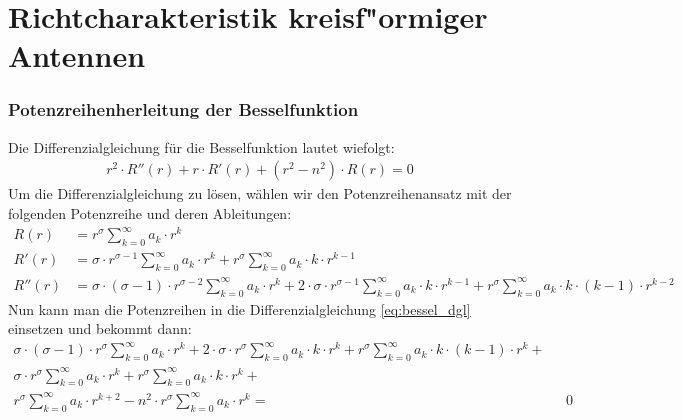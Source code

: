\chapter{Richtcharakteristik kreisf"ormiger Antennen\label{chapter:kreis}}
\begin{refsection}

\subsection{Potenzreihenherleitung der Besselfunktion}
Die Differenzialgleichung für die Besselfunktion lautet wiefolgt:
\begin{align}
	r^2 \cdot R''\left( r \right)
	+
	r \cdot R' \left( r \right)
	+
	\left( r^2 - n^2 \right) \cdot R \left( r \right)
	=
	0
	\label{eq:bessel_dgl}
\end{align}
Um die Differenzialgleichung zu l\"osen, w\"ahlen wir den Potenzreihenansatz mit der folgenden Potenzreihe und deren Ableitungen:
\begin{align*}
	R \left( r \right)
	&=
	r^{\sigma}
	\sum_{k=0}^{\infty} a_k \cdot r^k
\\
	R'\left( r \right)
	&=
	\sigma \cdot r^{\sigma - 1}
	\sum_{k=0}^{\infty} a_k \cdot r^k
	+
	r^{\sigma}
	\sum_{k=0}^{\infty} a_k \cdot k \cdot r^{k - 1}
\\
	R'' \left( r \right)
	&=
	\sigma \cdot \left( \sigma - 1 \right) \cdot r^{\sigma - 2}
	\sum_{k=0}^{\infty} a_k \cdot r^k
	+
	2 \cdot \sigma \cdot r^{\sigma - 1}
	\sum_{k=0}^{\infty} a_k \cdot k \cdot r^{k - 1}
	+
	r^{\sigma}
	\sum_{k=0}^{\infty} a_k \cdot k \cdot \left( k - 1 \right) \cdot r^{k - 2}	
\end{align*}
Nun kann man die Potenzreihen in die Differenzialgleichung \ref{eq:bessel_dgl} einsetzen und bekommt dann:
\begin{align*}
	\sigma \cdot \left( \sigma - 1 \right) \cdot r^{\sigma}
	\sum_{k=0}^{\infty} a_k \cdot r^k
	+
	2 \cdot \sigma \cdot r^{\sigma}
	\sum_{k=0}^{\infty} a_k \cdot k \cdot r^k
	+
	r^{\sigma}
	\sum_{k=0}^{\infty} a_k \cdot k \cdot \left( k - 1 \right) \cdot r^k
	+ \\
	\sigma \cdot r^{\sigma}
	\sum_{k=0}^{\infty} a_k \cdot r^k
	+
	r^{\sigma}
	\sum_{k=0}^{\infty} a_k \cdot k \cdot r^k
	+\\
	r^{\sigma}
	\sum_{k=0}^{\infty} a_k \cdot r^{k + 2}
	-
	n^2 \cdot r^{\sigma}
	\sum_{k=0}^{\infty} a_k \cdot r^k
	= & \text{ } 0
\end{align*}

\end{refsection}
